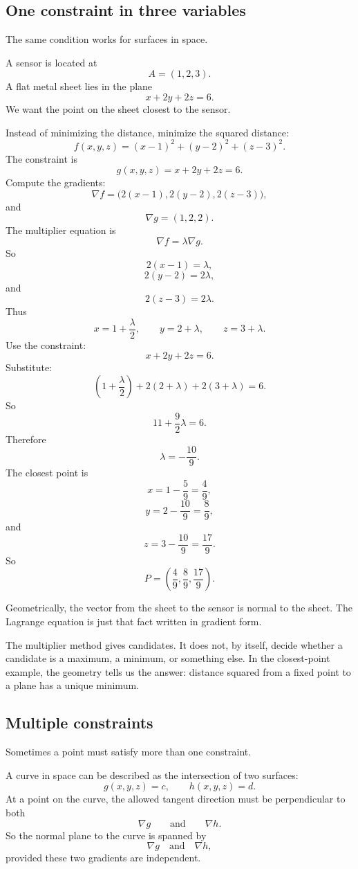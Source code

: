 \subsection{One constraint in three variables}

The same condition works for surfaces in space.

\begin{example}
A sensor is located at
\[
    A=(1,2,3).
\]
A flat metal sheet lies in the plane
\[
    x+2y+2z=6.
\]
We want the point on the sheet closest to the sensor.

Instead of minimizing the distance, minimize the squared distance:
\[
    f(x,y,z)=(x-1)^2+(y-2)^2+(z-3)^2.
\]
The constraint is
\[
    g(x,y,z)=x+2y+2z=6.
\]
Compute the gradients:
\[
    \nabla f=
    \bigl(2(x-1),2(y-2),2(z-3)\bigr),
\]
and
\[
    \nabla g=(1,2,2).
\]
The multiplier equation is
\[
    \nabla f=\lambda\nabla g.
\]
So
\[
    2(x-1)=\lambda,
\]
\[
    2(y-2)=2\lambda,
\]
and
\[
    2(z-3)=2\lambda.
\]
Thus
\[
    x=1+\frac{\lambda}{2},
    \qquad
    y=2+\lambda,
    \qquad
    z=3+\lambda.
\]
Use the constraint:
\[
    x+2y+2z=6.
\]
Substitute:
\[
    \left(1+\frac{\lambda}{2}\right)
    +2(2+\lambda)
    +2(3+\lambda)
    =
    6.
\]
So
\[
    11+\frac{9}{2}\lambda=6.
\]
Therefore
\[
    \lambda=-\frac{10}{9}.
\]
The closest point is
\[
    x=1-\frac59=\frac49,
\]
\[
    y=2-\frac{10}{9}=\frac89,
\]
and
\[
    z=3-\frac{10}{9}=\frac{17}{9}.
\]
So
\[
\boxed{
    P=\left(\frac49,\frac89,\frac{17}{9}\right).
}
\]

Geometrically, the vector from the sheet to the sensor is normal to the sheet.  The
Lagrange equation is just that fact written in gradient form.
\end{example}

The multiplier method gives candidates.  It does not, by itself, decide whether a
candidate is a maximum, a minimum, or something else.  In the closest-point example,
the geometry tells us the answer: distance squared from a fixed point to a plane has a
unique minimum.

\subsection{Multiple constraints}

Sometimes a point must satisfy more than one constraint.

A curve in space can be described as the intersection of two surfaces:
\[
    g(x,y,z)=c,
    \qquad
    h(x,y,z)=d.
\]
At a point on the curve, the allowed tangent direction must be perpendicular to both
\[
    \nabla g
    \qquad\text{and}\qquad
    \nabla h.
\]
So the normal plane to the curve is spanned by
\[
    \nabla g
    \quad\text{and}\quad
    \nabla h,
\]
provided these two gradients are independent.

